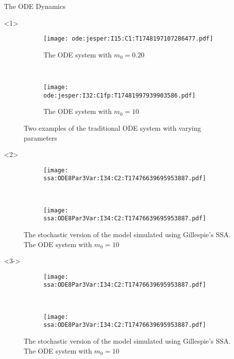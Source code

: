 \documentclass[aspectratio=169, onlytextwidth,  notheorems, sOuRcEs, fleqn, leqno, ]{RUCPresentation}
\begin{document}
\begin{frame}{The ODE Dynamics}


    \begin{onlyenv}<1>
        \begin{figure}[htbp]
            \centering
            \begin{subfigure}{0.5\framewidth}
                \centering
                \texttt{[image: ode:jesper:I15:C1:T1748197107286477.pdf]}
                \caption{The ODE system with \(m_0 = 0.20\)}
            \end{subfigure}~
            \begin{subfigure}{0.5\framewidth}
                \centering
                \texttt{[image: ode:jesper:I32:C1fp:T17481997939903586.pdf]}
                \caption{The ODE system with \(m_0 = 10\)}
            \end{subfigure}
            \caption{ Two examples of the traditional ODE system with varying parameters }
        \end{figure}
    \end{onlyenv}

    \begin{onlyenv}<2>
        \begin{figure}[htbp]
            \centering
            \begin{subfigure}{0.5\framewidth}
                \centering
                \texttt{[image: ssa:ODE8Par3Var:I34:C2:T17476639695953887.pdf]}
            \end{subfigure}~
            \begin{subfigure}{0.5\framewidth}
                \centering
                \texttt{[image: ssa:ODE8Par3Var:I34:C2:T17476639695953887.pdf]}
            \end{subfigure}
            \caption{
                The stochastic version of the model simulated using
                Gillespie's SSA.
                The ODE system with \(m_0 = 10\)
            }
        \end{figure}
    \end{onlyenv}

    \begin{onlyenv}<3->
        \begin{figure}[htbp]
            \centering
            \begin{subfigure}{0.5\framewidth}
                \centering
                \texttt{[image: ssa:ODE8Par3Var:I34:C2:T17476639695953887.pdf]}
            \end{subfigure}~
            \begin{subfigure}{0.5\framewidth}
                \centering
                \texttt{[image: ssa:ODE8Par3Var:I34:C2:T17476639695953887.pdf]}
            \end{subfigure}
            \caption{
                The stochastic version of the model simulated using
                Gillespie's SSA.
                The ODE system with \(m_0 = 10\)
            }
        \end{figure}
    \end{onlyenv}


\end{frame}
\end{document}
